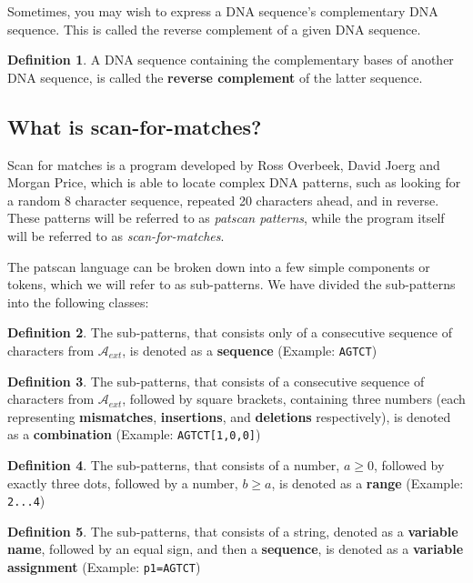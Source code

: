 \documentclass[12pt]{article}
\theoremstyle{definition}
\newtheorem{mydef}{Definition}
\begin{document}
Sometimes, you may wish to express a DNA sequence's complementary DNA sequence. This is called the reverse complement of a given DNA sequence.

\begin{mydef}
A DNA sequence containing the complementary bases of another DNA sequence, is called the \textbf{reverse complement} of the latter sequence.
\end{mydef}

\subsection{What is scan-for-matches?}

Scan for matches is a program developed by Ross Overbeek, David Joerg and Morgan Price\cite{scan-for-matches}, which is able to locate complex DNA patterns, such as looking for a random 8 character sequence, repeated 20 characters ahead, and in reverse. These patterns will be referred to as \textit{patscan patterns}, while the program itself will be referred to as \textit{scan-for-matches}.

The patscan language can be broken down into a few simple components or tokens, which we will refer to as sub-patterns. We have divided the sub-patterns into the following classes:

\begin{mydef}
The sub-patterns, that consists only of a consecutive sequence of characters from $\mathcal{A}_{ext}$, is denoted as a \textbf{sequence} (Example: \texttt{AGTCT})
\end{mydef}

\begin{mydef}
The sub-patterns, that consists of a consecutive sequence of characters from $\mathcal{A}_{ext}$, followed by square brackets, containing three numbers (each representing \textbf{mismatches}, \textbf{insertions}, and \textbf{deletions} respectively), is denoted as a \textbf{combination} (Example: \texttt{AGTCT[1,0,0]})
\end{mydef}

\begin{mydef}
The sub-patterns, that consists of a number, $a \geq 0$, followed by exactly three dots, followed by a number, $b \geq a$, is denoted as a \textbf{range} (Example: \texttt{2...4})
\end{mydef}

\begin{mydef}
The sub-patterns, that consists of a string, denoted as a \textbf{variable name}, followed by an equal sign, and then a \textbf{sequence}, is denoted as a \textbf{variable assignment} (Example: \texttt{p1=AGTCT})
\end{mydef}
\end{document}
